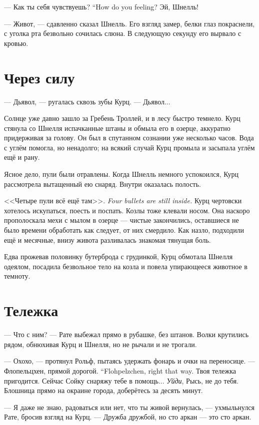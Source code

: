 {--- Как ты себя чувствуешь?}
{``How do you feeling?}
Эй, Шнелль!

--- Живот, --- сдавленно сказал Шнелль.
Его взгляд замер, белки глаз покраснели, с уголка рта безвольно сочилась слюна.
В следующую секунду его вырвало с кровью.

\section{Через силу}

--- Дьявол, --- ругалась сквозь зубы Курц.
--- Дьявол...

Солнце уже давно зашло за Гребень Троллей, и в лесу быстро темнело.
Курц стянула со Шнелля испачканные штаны и обмыла его в озерце, аккуратно придерживая за голову.
Он был в спутанном сознании уже несколько часов.
Вода с углём помогла, но ненадолго;
на всякий случай Курц промыла и засыпала углём ещё и рану.

Ясное дело, пули были отравлены.
Когда Шнелль немного успокоился, Курц рассмотрела вытащенный ею снаряд.
Внутри оказалась полость.

{<<Четыре пули всё ещё там>>.}
{\textit{Four bullets are still inside.}}
Курц чертовски хотелось искупаться, поесть и поспать.
Козлы тоже клевали носом.
Она наскоро прополоскала мехи с мылом в озерце --- чистые закончились, оставшиеся не было времени обработать как следует, от них смердило.
Как назло, подходили ещё и месячные, внизу живота разливалась знакомая тянущая боль.

Едва прожевав половинку бутерброда с грудинкой, Курц обмотала Шнелля одеялом, посадила безвольное тело на козла и повела упирающееся животное в темноту.

\section{Тележка}

--- Что с ним? --- Рате выбежал прямо в рубашке, без штанов.
Волки крутились рядом, обнюхивая Курц и Шнелля, но не рычали и не трогали.

--- Охохо, --- протянул Рольф, пытаясь удержать фонарь и очки на переносице.
{--- Флопельцхен, прямой дорогой.}
{``Flohpelzchen, right that way.}
Твоя тележка пригодится.
Сейчас Сойку снаряжу тебе в помощь...
\textit{Уйди}, Рысь, не до тебя.
Блошница прямо на окраине города, доберётесь за десять минут.

--- Я даже не знаю, радоваться или нет, что ты живой вернулась, --- ухмыльнулся Рате, бросив взгляд на Курц.
--- Дружба дружбой, но сто аркан --- это сто аркан.

